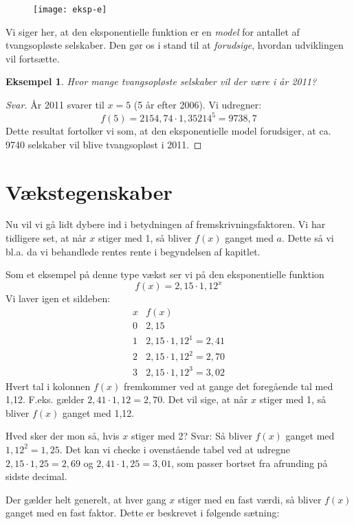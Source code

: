 \documentclass[12pt,oneside,a4paper]{article}
\theoremstyle{plain}
\newtheorem*{eks}{Eksempel}
\begin{document}
\begin{figure}[ht]
    \centering
    \texttt{[image: eksp-e]}
    \label{eksp-e}
\end{figure}

Vi siger her, at den eksponentielle funktion er en {\em model} for antallet af
tvangsopløste selskaber. Den gør os i stand til at {\em forudsige}, hvordan
udviklingen vil fortsætte.

\begin{eks}
    Hvor mange tvangsopløste selskaber vil der være i år 2011?
\end{eks}
\begin{proof}[Svar]
    År 2011 svarer til $x=5$ (5 år efter 2006). Vi udregner:
    $$
    f(5) = 2154,74 \cdot 1,35214^5 = 9738,7
    $$
    Dette resultat fortolker vi som, at den eksponentielle
    model forudsiger, at ca. 9740 selskaber vil blive tvangsopløst i 2011.
\end{proof}
    

\section*{Vækstegenskaber}
Nu vil vi gå lidt dybere ind i betydningen af fremskrivningsfaktoren. Vi har tidligere
set, at når $x$ stiger med 1, så bliver $f(x)$ ganget med $a$. Dette så vi bl.a. da
vi behandlede rentes rente i begyndelsen af kapitlet.

Som et eksempel på denne type vækst ser vi på den eksponentielle funktion
$$
f(x) = 2,15 \cdot 1,12^x
$$
Vi laver igen et sildeben:
$$
\begin{array}{r|l}
    x & f(x) \\
    \hline
    0 & 2,15 \\
    1 & 2,15 \cdot 1,12^1 = 2,41 \\
    2 & 2,15 \cdot 1,12^2 = 2,70 \\
    3 & 2,15 \cdot 1,12^3 = 3,02
\end{array}
$$
Hvert tal i kolonnen $f(x)$ fremkommer ved at gange det foregående tal med
1,12. F.eks. gælder $2,41 \cdot 1,12 = 2,70$. Det vil sige, at når $x$ stiger
med 1, så bliver $f(x)$ ganget med 1,12.

Hved sker der mon så, hvis $x$ stiger med 2? Svar: Så bliver $f(x)$ ganget med
$1,12^2 = 1,25$.  Det kan vi checke i ovenstående tabel ved at udregne
$2,15\cdot1,25 = 2,69$ og $2,41\cdot1,25 = 3,01$, som passer bortset fra afrunding på
sidste decimal.

Der gælder helt generelt, at hver gang $x$ stiger med en fast værdi, så bliver
$f(x)$ ganget med en fast faktor. Dette er beskrevet i følgende sætning:
\end{document}
